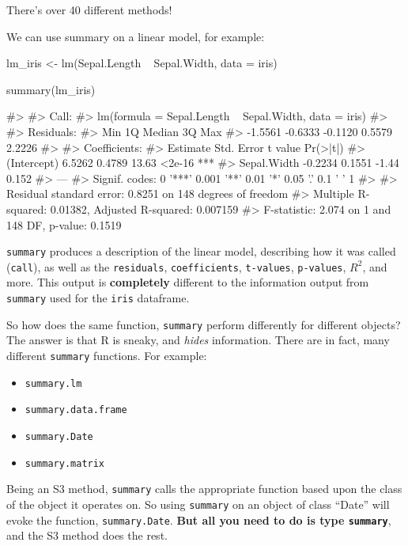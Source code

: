 There's over 40 different methods!

We can use summary on a linear model, for example:

\begin{Schunk}
\begin{Sinput}
lm_iris <- lm(Sepal.Length ~ Sepal.Width, data = iris)

summary(lm_iris)
\end{Sinput}
\begin{Soutput}
#> 
#> Call:
#> lm(formula = Sepal.Length ~ Sepal.Width, data = iris)
#> 
#> Residuals:
#>     Min      1Q  Median      3Q     Max 
#> -1.5561 -0.6333 -0.1120  0.5579  2.2226 
#> 
#> Coefficients:
#>             Estimate Std. Error t value Pr(>|t|)    
#> (Intercept)   6.5262     0.4789   13.63   <2e-16 ***
#> Sepal.Width  -0.2234     0.1551   -1.44    0.152    
#> ---
#> Signif. codes:  0 '***' 0.001 '**' 0.01 '*' 0.05 '.' 0.1 ' ' 1
#> 
#> Residual standard error: 0.8251 on 148 degrees of freedom
#> Multiple R-squared:  0.01382,    Adjusted R-squared:  0.007159 
#> F-statistic: 2.074 on 1 and 148 DF,  p-value: 0.1519
\end{Soutput}
\end{Schunk}

\texttt{summary} produces a description of the linear model, describing
how it was called (\texttt{call}), as well as the \texttt{residuals},
\texttt{coefficients}, \texttt{t-values}, \texttt{p-values}, \(R^2\),
and more. This output is \textbf{completely} different to the
information output from \texttt{summary} used for the \texttt{iris}
dataframe.

So how does the same function, \texttt{summary} perform differently for
different objects? The answer is that R is sneaky, and \emph{hides}
information. There are in fact, many different \texttt{summary}
functions. For example:

\begin{itemize}
\tightlist
\item
  \texttt{summary.lm}
\item
  \texttt{summary.data.frame}
\item
  \texttt{summary.Date}
\item
  \texttt{summary.matrix}
\end{itemize}

Being an S3 method, \texttt{summary} calls the appropriate function
based upon the class of the object it operates on. So using
\texttt{summary} on an object of class ``Date'' will evoke the function,
\texttt{summary.Date}. \textbf{But all you need to do is type
\texttt{summary}}, and the S3 method does the rest.

